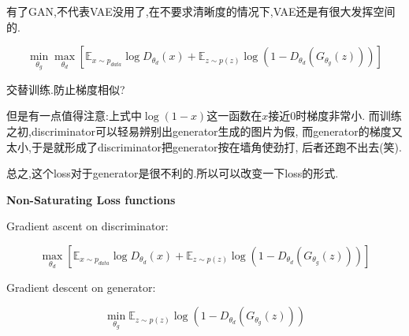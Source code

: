 	有了GAN,不代表VAE没用了,在不要求清晰度的情况下,VAE还是有很大发挥空间的.
	
	\begin{equation}
		\min _{\theta_{g}} \max _{\theta_{d}}\left[\mathbb{E}_{x \sim p_{d a t a}} \log D_{\theta_{d}}(x)+\mathbb{E}_{z \sim p(z)} \log \left(1-D_{\theta_{d}}\left(G_{\theta_{g}}(z)\right)\right)\right]
	\end{equation}

	交替训练.防止梯度相似?
	
	但是有一点值得注意:上式中$\log(1-x)$这一函数在$x$接近$0$时梯度非常小.
	而训练之初,discriminator可以轻易辨别出generator生成的图片为假,
	而generator的梯度又太小,于是就形成了discriminator把generator按在墙角使劲打,
	后者还跑不出去(笑).
	
	总之,这个loss对于generator是很不利的.所以可以改变一下loss的形式.
	
	\textbf{Non-Saturating Loss functions}
	
	Gradient ascent on discriminator:
	
	\begin{equation}
	\max_{\theta_d}\left[\mathbb{E}_{x\sim p_{data}}\log D_{\theta_d}(x)+\mathbb{E}_{z\sim p(z)}\log(1-D_{\theta_d}(G_{\theta_g}(z)))\right]
	\end{equation}

	Gradient descent on generator:

	\begin{equation}
	\min_{\theta_g}\mathbb{E}_{z\sim p(z)}\log(1-D_{\theta_d}(G_{\theta_g}(z)))	
	\end{equation}


